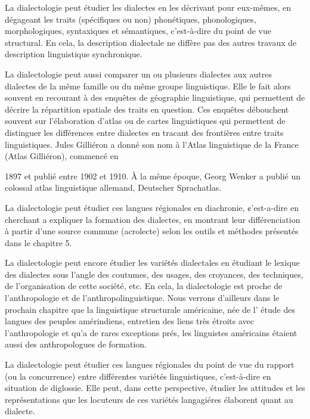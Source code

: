 La dialectologie peut étudier les dialectes en les décrivant pour eux-mêmes, en dégageant les traits (spécifiques ou non) phonétiques, phonologiques, morphologiques, syntaxiques et sémantiques, c’est-à-dire du point de vue structural. En cela, la description dialectale ne diffère pas des autres travaux de description linguistique synchronique.

La dialectologie peut aussi comparer un ou plusieurs dialectes aux autres dialectes de la même famille ou du même groupe linguistique. Elle le fait alors souvent en recourant à des enquêtes de géographie linguistique, qui permettent de décrire la répartition spatiale des traits en question. Ces enquêtes débouchent souvent sur l’élaboration d’atlas ou de cartes linguistiques qui permettent de distinguer les différences entre dialectes en tracant des frontières entre traits linguistiques. Jules Gilliéron a donné son nom à l’Atlas linguistique de la France (Atlas Gilliéron), commencé en


1897 et publié entre 1902 et 1910. À la même époque, Georg Wenker a publié un colossal atlas linguistique allemand, Deutscher Sprachatlas.


La dialectologie peut étudier ces langues régionales en diachronie, ¢’est-a-dire en cherchant a expliquer la formation des dialectes, en montrant leur différenciation à partir d’une source commune (acrolecte) selon les outils et méthodes présentés dans le chapitre 5.

La dialectologie peut encore étudier les variétés dialectales en étudiant le lexique des dialectes sous l’angle des coutumes, des usages, des croyances, des techniques, de l’organisation de cette société, etc. En cela, la dialectologie est proche de l’anthropologie et de l’anthropolinguistique. Nous verrons d’ailleurs dans le prochain chapitre que la linguistique structurale américaine, née de l’ étude des langues des peuples amérindiens, entretien des liens très étroits avec l’anthropologie et qu’a de rares exceptions prés, les linguistes américains étaient aussi des anthropologues de formation.

La dialectologie peut étudier ces langues régionales du point de vue du rapport (ou la concurrence) entre différentes variétés linguistiques, c’est-à-dire en situation de diglossie. Elle peut, dans cette perspective, étudier les attitudes et les représentations que les locuteurs de ces variétés langagiéres élaborent quant au dialecte.

